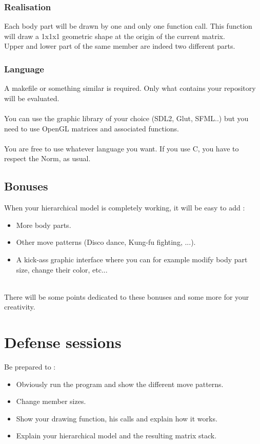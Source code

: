 \documentclass{42-en}
\begin{document}
		\subsection{Realisation}
			Each body part will be drawn by one and only one function call. This function will draw a 1x1x1 geometric shape at the origin of the current matrix.
		\\
		\info
		{
			Upper and lower part of the same member are indeed two different parts.
		}
		\
		\subsection{Language}
			A makefile or something similar is required. Only what contains your repository will be evaluated.\\
			\\
			You can use the graphic library of your choice (SDL2, Glut, SFML..) but you need to use OpenGL matrices and associated functions.\\
			\\
			You are free to use whatever language you want. If you use C, you have to respect the Norm, as usual.\\

		\newpage
			\section{Bonuses}

			When your hierarchical model is completely working, it will be easy to add :
			\begin{itemize}
				\item More body parts.
				\item Other move patterns (Disco dance, Kung-fu fighting, ...).
				\item A kick-ass graphic interface where you can for example modify body part size, change their color, etc...
			\end{itemize}
			\
			\\
			There will be some points dedicated to these bonuses and some more for your creativity.



\newpage
	\chapter {Defense sessions}
		Be prepared to :
		\begin{itemize}
			\item Obviously run the program and show the different move patterns.
			\item Change member sizes.
			\item Show your drawing function, his calls and explain how it works.
			\item Explain your hierarchical model and the resulting matrix stack.
		\end{itemize}

\end{document}
